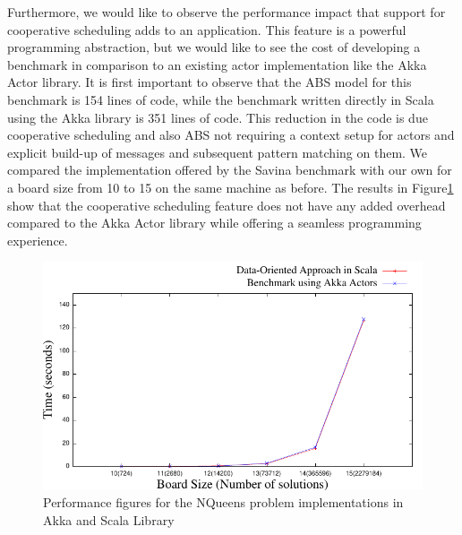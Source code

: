 \par Furthermore, we would like to observe the performance impact that support for cooperative scheduling adds to an application. This feature is a powerful programming abstraction, but we would like to see the cost of developing a benchmark in comparison to an existing actor implementation like the Akka Actor library. It is first important to observe that the ABS model for this benchmark is 154 lines of code, while the benchmark written directly in Scala using the Akka library is 351 lines of code. This reduction in the code is due cooperative scheduling and also ABS not requiring a context setup for actors and explicit build-up of messages and subsequent pattern matching on them. We compared the implementation offered by the Savina benchmark with our own for a board size from 10 to 15 on the same machine as before. The results in Figure\ref{aj} show that the cooperative scheduling feature does not have any added overhead compared to the Akka Actor library while offering a seamless programming experience.

\begin{figure}
\centering
\includegraphics[scale=.7]{akka8.pdf}
\caption{Performance figures for the NQueens problem implementations in Akka and Scala Library}
\label{aj}
\end{figure}



